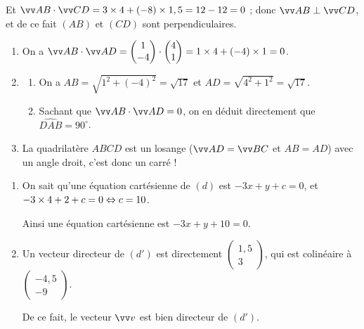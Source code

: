 \documentclass[a4paper,11pt]{article}
\begin{document}
\smallskip

Et $\vect{AB}\cdot\vect{CD}=3 \times 4 + (-8) \times 1,5 = 12 - 12 = 0$ ; donc $\vect{AB} \perp \vect{CD}$, et de ce fait $(AB)$ et $(CD)$ sont perpendiculaires.

\bigskip


\begin{enumerate}
	\item On a $\vect{AB}\cdot\vect{AD} = \begin{pmatrix} 1 \\ -4 \end{pmatrix} \cdot \begin{pmatrix} 4 \\ 1 \end{pmatrix} = 1 \times 4 + (-4) \times 1 = 0$.
	\item 
	\begin{enumerate}
		\item On a $AB = \sqrt{1^2+(-4)^2}=\sqrt{17}$ et $AD = \sqrt{4^2+1^2}=\sqrt{17}$.
		\item Sachant que $\vect{AB}\cdot\vect{AD} = 0$, on en déduit directement que $\widehat{DAB}=90^{\circ}$.
	\end{enumerate}
	\item La quadrilatère $ABCD$ est un losange ($\vect{AD}=\vect{BC}$ et $AB=AD$) avec un angle droit, c'est donc un carré !
\end{enumerate}

\medskip


\begin{enumerate}
	\item On sait qu'une équation cartésienne de $(d)$ est $-3x+y+c=0$, et $-3\times4+2+c=0 \Leftrightarrow c=10$.
	
	Ainsi une équation cartésienne est $-3x+y+10=0$.
	\item Un vecteur directeur de $(d')$ est directement $\begin{pmatrix} 1,5 \\ 3 \end{pmatrix}$, qui est colinéaire à $\begin{pmatrix} -4,5 \\ -9 \end{pmatrix}$.
	
	De ce fait, le vecteur $\vect{v}$ est bien directeur de $(d')$.
\end{enumerate}

\medskip
\end{document}
